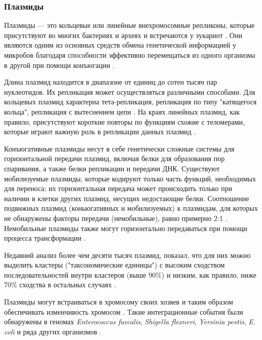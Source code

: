 \subsubsection{Плазмиды}
Плазмиды --- это кольцевые или линейные внехромосомные репликоны, которые присутствуют во многих бактериях и археях и встречаются у эукариот \cite{shintani2015genomics}. Они являются одним из основных средств обмена генетической информацией у микробов благодаря способности эффективно перемещаться из одного организма в другой при помощи конъюгации \cite{guglielmini2011repertoire}. 

Длина плазмид находится в диапазоне от единиц до сотен тысяч пар нуклеотидов. Их репликация может осуществляться различными способами. Для кольцевых плазмид характерна тета-репликация, репликация по типу "катящегося кольца", репликация с вытеснением цепи \cite{del1998replication}. На краях линейных плазмид, как правило, присутствуют короткие повторы по функциям схожие с теломерами, которые играют важную роль в репликации данных плазмид \cite{ravin2011n15}.

Конъюгативные плазмиды несут в себе генетически сложные системы для горизонтальной передачи плазмид, включая белки для образования пор спаривания, а также белки репликации и передачи ДНК. Существуют мобилизуемые плазмиды, которые кодируют только часть функций, необходимых для переноса; их горизонтальная передача может происходить только при наличии в клетки других плазмид, несущих недостающие белки. Соотношение подвижных плазмид (коньюгативных и мобилизуемых) к плазмидам, для которых не обнаружены факторы передачи (немобильные), равно примерно 2:1 \cite{redondo2020pathways}. Немобильные плазмиды также могут горизонтально передаваться при помощи процесса трансформации \cite{hulter2017evolutionary}. 

Недавний анализ более чем десяти тысяч плазмид, показал, что для них можно выделить кластеры ("таксономические единицы") с высоким сходством последовательностей внутри кластеров (выше 90\%) и низким, как правило, ниже 70\% сходства в остальных случаях \cite{redondo2020pathways}.

Плазмиды могут встраиваться в хромосому своих хозяев и таким образом обеспечивать изменчивость хромосом \cite{zechner2000conjugative, brunder2000genome}. Такие интеграционные события были обнаружены в геномах \textit{Enterococcus faecalis}, \textit{Shigella flexneri}, \textit{Yersinia pestis}, \textit{E. coli} и ряда других организмов \cite{myers2006role}. 

